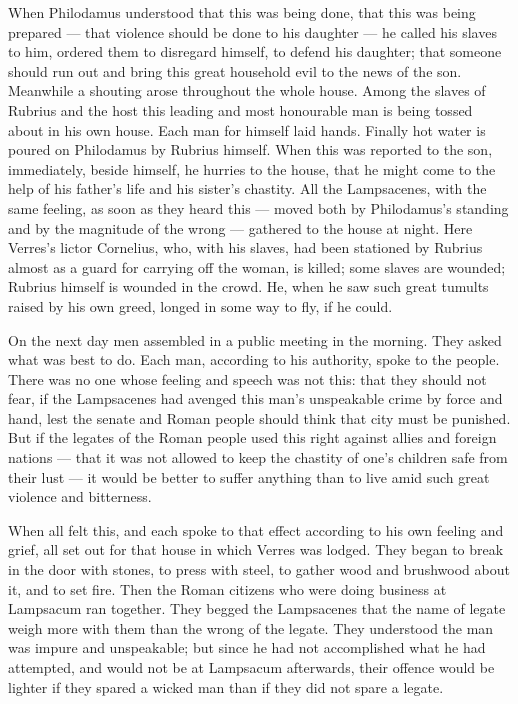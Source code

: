  When Philodamus understood that this was being done, that this was being prepared --- that violence should be done to his daughter --- he called his slaves to him, ordered them to disregard himself, to defend his daughter; that someone should run out and bring this great household evil to the news of the son. Meanwhile a shouting arose throughout the whole house. Among the slaves of Rubrius and the host this leading and most honourable man is being tossed about in his own house. Each man for himself laid hands. Finally hot water is poured on Philodamus by Rubrius himself. When this was reported to the son, immediately, beside himself, he hurries to the house, that he might come to the help of his father's life and his sister's chastity. All the Lampsacenes, with the same feeling, as soon as they heard this --- moved both by Philodamus's standing and by the magnitude of the wrong --- gathered to the house at night. Here Verres's lictor Cornelius, who, with his slaves, had been stationed by Rubrius almost as a guard for carrying off the woman, is killed; some slaves are wounded; Rubrius himself is wounded in the crowd. He, when he saw such great tumults raised by his own greed, longed in some way to fly, if he could.

 On the next day men assembled in a public meeting in the morning. They asked what was best to do. Each man, according to his authority, spoke to the people. There was no one whose feeling and speech was not this: that they should not fear, if the Lampsacenes had avenged this man's unspeakable crime by force and hand, lest the senate and Roman people should think that city must be punished. But if the legates of the Roman people used this right against allies and foreign nations --- that it was not allowed to keep the chastity of one's children safe from their lust --- it would be better to suffer anything than to live amid such great violence and bitterness.

 When all felt this, and each spoke to that effect according to his own feeling and grief, all set out for that house in which Verres was lodged. They began to break in the door with stones, to press with steel, to gather wood and brushwood about it, and to set fire. Then the Roman citizens who were doing business at Lampsacum ran together. They begged the Lampsacenes that the name of legate weigh more with them than the wrong of the legate. They understood the man was impure and unspeakable; but since he had not accomplished what he had attempted, and would not be at Lampsacum afterwards, their offence would be lighter if they spared a wicked man than if they did not spare a legate.

